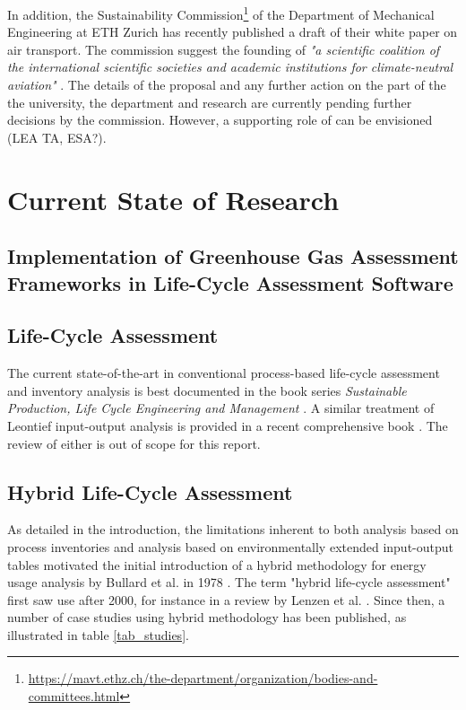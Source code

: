 \documentclass{article}
\begin{document}
    In addition, the Sustainability Commission\footnote{\url{https://mavt.ethz.ch/the-department/organization/bodies-and-committees.html}} of the Department of Mechanical Engineering at ETH Zurich has recently published a draft of their white paper on air transport. The commission suggest the founding of  \textit{"a scientific coalition of the international scientific societies and academic institutions for climate-neutral aviation"} \cite{mazzotti_air_2022}. The details of the proposal and any further action on the part of the the university, the department and research are currently pending further decisions by the commission. However, a supporting role of can be envisioned (LEA TA, ESA?).

\newpage
\section{Current State of Research}

    \subsection{Implementation of Greenhouse Gas Assessment Frameworks in Life-Cycle Assessment Software}
    
    \subsection{Life-Cycle Assessment}
    
        The current state-of-the-art in conventional process-based life-cycle assessment and inventory analysis is best documented in the book series \textit{Sustainable Production, Life Cycle Engineering and Management} \cite{teuteberg_progress_2019}\cite{albrecht_progress_2021}. A similar treatment of Leontief input-output analysis is provided in a recent comprehensive book \cite{miller_input-output_2022}. The review of either is out of scope for this report.

    \subsection{Hybrid Life-Cycle Assessment}
        
        As detailed in the introduction, the limitations inherent to both analysis based on process inventories and analysis based on environmentally extended input-output tables motivated the initial introduction of a hybrid methodology for energy usage analysis by Bullard et al. in 1978 \cite{bullard_net_1978}. The term "hybrid life-cycle assessment" first saw use after 2000, for instance in a review by Lenzen et al. \cite{lenzen_errors_2000}. Since then, a number of case studies using hybrid methodology has been published, as illustrated in table \ref{tab_studies}.
        
\end{document}
